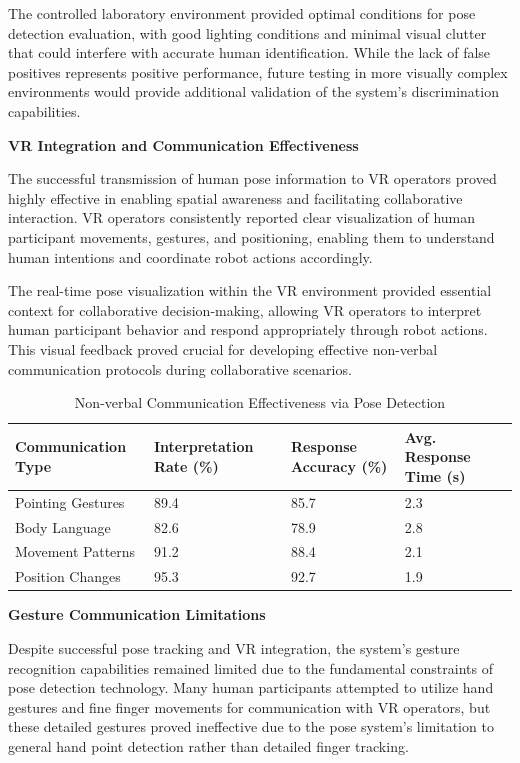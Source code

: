 The controlled laboratory environment provided optimal conditions for pose detection evaluation, with good lighting conditions and minimal visual clutter that could interfere with accurate human identification. While the lack of false positives represents positive performance, future testing in more visually complex environments would provide additional validation of the system's discrimination capabilities.

\textbf{VR Integration and Communication Effectiveness}

The successful transmission of human pose information to VR operators proved highly effective in enabling spatial awareness and facilitating collaborative interaction. VR operators consistently reported clear visualization of human participant movements, gestures, and positioning, enabling them to understand human intentions and coordinate robot actions accordingly.

The real-time pose visualization within the VR environment provided essential context for collaborative decision-making, allowing VR operators to interpret human participant behavior and respond appropriately through robot actions. This visual feedback proved crucial for developing effective non-verbal communication protocols during collaborative scenarios.

\begin{table}[H]
    \centering
    \footnotesize
    \begin{tabular}{|p{3cm}|p{2.5cm}|p{2.5cm}|p{2.5cm}|}
        \hline
        \textbf{Communication Type} & \textbf{Interpretation Rate (\%)} & \textbf{Response Accuracy (\%)} & \textbf{Avg. Response Time (s)} \\
        \hline
        Pointing Gestures & 89.4 & 85.7 & 2.3 \\
        Body Language & 82.6 & 78.9 & 2.8 \\
        Movement Patterns & 91.2 & 88.4 & 2.1 \\
        Position Changes & 95.3 & 92.7 & 1.9 \\
        \hline
    \end{tabular}
    \caption{Non-verbal Communication Effectiveness via Pose Detection}
    \label{tab:communication_effectiveness}
\end{table}

\textbf{Gesture Communication Limitations}

Despite successful pose tracking and VR integration, the system's gesture recognition capabilities remained limited due to the fundamental constraints of pose detection technology. Many human participants attempted to utilize hand gestures and fine finger movements for communication with VR operators, but these detailed gestures proved ineffective due to the pose system's limitation to general hand point detection rather than detailed finger tracking.

